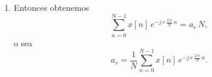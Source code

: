 \begin{enumerate}
\begin{enumerate}
        \item  Recordamos la propiedad de las series geom\'{e}tricas convergentes
        \begin{equation}
                \sum_{n=0}^{N-1}a^n=\frac{1-a^{N}}{1-a}, a < 1,
        \end{equation}
        para obtener 
        \begin{equation}
                \sum_{n=0}^{N-1}\left( e^{j \, k \, \frac{2 \, \pi }{N} }\right) ^n=
                        \frac{1-\left( e^{j \, k \, \frac{2 \, \pi }{N} }\right) ^{N}}
                                {1-\left(e^{j \, k \, \frac{2 \, \pi }{N} }\right) }=
                \frac{1-e^{j \, k \, 2 \, \pi }}{1-\left(e^{j \, k \, \frac{2 \, \pi }{N} }\right) }=0.
        \end{equation}
\end{enumerate}

\item Entonces obtenemos 
\begin{equation}
        \sum_{n=0}^{N-1}x\left[ n\right] \, e^{-j \, r \, \frac{2 \, \pi }{N} \, n} = a_{r} \, N,
\end{equation}
o sea 
\begin{equation}
   a_{r} = \frac{1}{N}\sum_{n=0}^{N-1}x\left[ n\right] \, e^{-j \, r \, \frac{2 \, \pi }{N} \, n}. \label{dtfs.ar}
\end{equation}
\end{enumerate}

